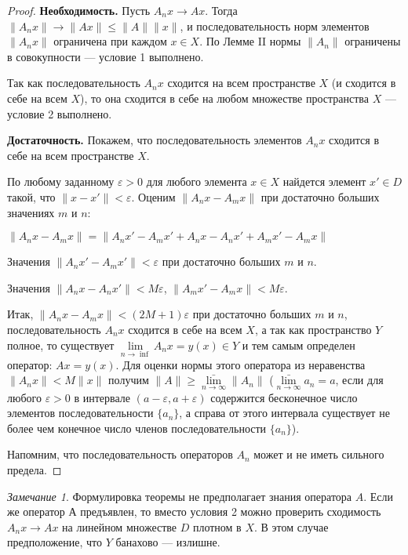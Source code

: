 \documentclass[12pt,a4paper,titlepage]{book}
\theoremstyle{definition}
\theoremstyle{plain}
\theoremstyle{remark}
\newtheorem*{remark}{Замечание}
\theoremstyle{plain}
\begin{document}
\begin{proof}
\textbf{Необходимость.} Пусть $A_n x \to A x$. Тогда $\lVert A_n x\rVert \to \lVert A x\rVert \le \lVert A\rVert \lVert x\rVert$, и последовательность норм элементов $\lVert A_n x\rVert$ ограничена при каждом $x \in X$. По Лемме II нормы $\lVert A_n\rVert$ ограничены в совокупности --- условие 1 выполнено.

Так как последовательность $A_n x$ сходится на всем пространстве $X$ (и сходится в себе на всем $X$), то она сходится в себе на любом множестве пространства $X$ --- условие 2 выполнено.

\textbf{Достаточность.} Покажем, что последовательность элементов $A_n x$ сходится в себе на всем пространстве $X$.

По любому заданному $\varepsilon > 0$ для любого элемента $x \in X$ найдется элемент $x' \in D$ такой, что $\lVert x - x'\rVert < \varepsilon$. Оценим $\lVert A_n x - A_m x\rVert$ при достаточно больших значениях $m$ и $n$:

\begin{center}
$\lVert A_n x - A_m x\rVert = \lVert A_n x' - A_m x' + A_n x - A_n x' + A_m x' - A_m x\rVert$
\end{center}

Значения $\lVert A_n x' - A_m x'\rVert < \varepsilon$ при достаточно больших $m$ и $n$.

Значения $\lVert A_n x - A_n x'\rVert < M\varepsilon$, $\lVert A_m x' - A_m x\rVert < M\varepsilon$.

Итак, $\lVert A_n x - A_m x\rVert < (2M +1)\varepsilon$ при достаточно больших $m$ и $n$, последовательность $A_n x$ сходится в себе на всем $X$, а так как пространство $Y$ полное, то существует $\lim\limits_{n \to \inf} A_n x = y(x) \in Y$ и тем самым определен оператор: $A x = y(x)$. Для оценки нормы этого оператора из неравенства $\lVert A_n x\rVert < M\lVert x\rVert$ получим $\lVert A\rVert \ge \bar{\lim\limits_{n \to \infty}}\lVert A_n\rVert$ ($\bar{\lim\limits_{n \to \infty}}a_n = a$, если для любого $\varepsilon > 0$ в интервале $(a-\varepsilon, a+\varepsilon)$ содержится бесконечное число элементов последовательности $\lbrace a_n\rbrace$, а справа от этого интервала существует не более чем конечное число членов последовательности $\lbrace a_n\rbrace$).

Напомним, что последовательность операторов $A_n$ может и не иметь сильного предела.
\end{proof}

\begin{remark}
Формулировка теоремы не предполагает знания оператора $A$. Если же оператор $А$ предъявлен, то вместо условия 2 можно проверить сходимость $A_n x\to A x$ на линейном множестве $D$ плотном в $X$. В этом случае предположение, что $Y$ банахово --- излишне.
\end{remark}
\end{document}
